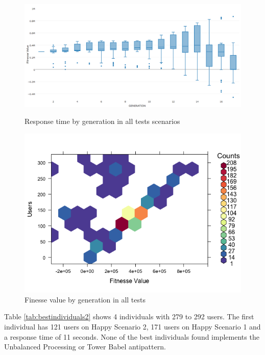 \begin{figure}[h]
\begin{minipage}{.5\textwidth}
\centering
\includegraphics[width=1\textwidth]{./images/experiment2-3.png}
    \caption{Response time by generation in all tests scenarios}
\label{fig:summaryboxplot2}
\end{minipage}
\begin{minipage}{.5\textwidth}
\centering
\includegraphics[width=1\textwidth]{./images/experiment2-4.png}
\caption{Finesse value by generation in all tests}
\label{fig:density2}
\end{minipage}

\end{figure}

Table \ref{tab:bestindividuals2} shows 4 individuals with 279 to 292 users.  The first individual has 121 users on Happy Scenario 2, 171 users on Happy Scenario 1 and a response time of 11 seconds. None of the best individuals found implements the Unbalanced Processing or Tower Babel antipattern.

